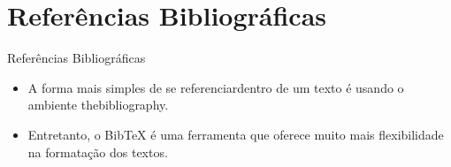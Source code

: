 \section{Referências Bibliográficas}

\begin{frame}{Referências Bibliográficas}
\begin{itemize}
 \item A forma mais simples de se referenciardentro de um texto é usando o ambiente {\ttfamily thebibliography}.
\item Entretanto, o Bib\TeX{} é uma ferramenta que oferece muito mais flexibilidade na formatação dos textos.
\end{itemize}
\end{frame}

\begin{frame}

\end{frame}